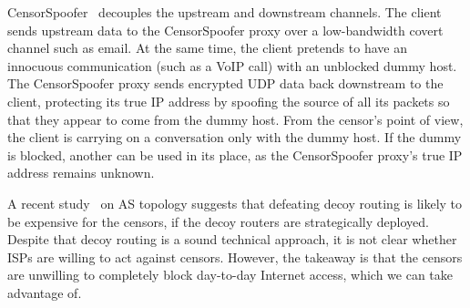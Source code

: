 \documentclass{article}
\begin{document}
CensorSpoofer~\cite{censorspoofer}
decouples the upstream and downstream channels.
The client sends upstream data to the CensorSpoofer proxy over a low-bandwidth covert channel such as email.
At the same time, the client pretends to have an innocuous communication (such as a VoIP call) with an unblocked dummy host.
The CensorSpoofer proxy sends encrypted UDP data back downstream to the client,
protecting its true IP address by spoofing the source of all its packets
so that they appear to come from the dummy host.
From the censor's point of view, the client is carrying on a conversation only with the dummy host.
If the dummy is blocked, another can be used in its place,
as the CensorSpoofer proxy's true IP address remains unknown.

A recent study~\cite{nodirectionhome} on AS
topology suggests that defeating decoy routing is likely to be expensive for the
censors, if the decoy routers are strategically deployed. Despite that decoy
routing is a sound technical approach, it is not clear whether ISPs are
willing to act against censors. However, the takeaway is that the
censors are unwilling to completely block day-to-day Internet access, which we
can take advantage of.

\end{document}
